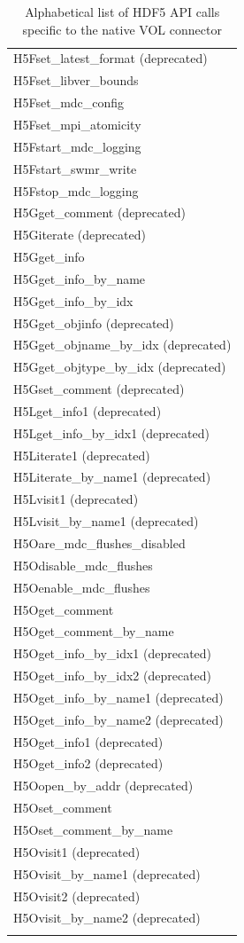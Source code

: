 \begin{longtable}{ |>{\raggedright\arraybackslash}p{\linewidth}| }
    H5Fset\_latest\_format (deprecated) \\
    H5Fset\_libver\_bounds \\
    H5Fset\_mdc\_config \\
    H5Fset\_mpi\_atomicity \\
    H5Fstart\_mdc\_logging \\
    H5Fstart\_swmr\_write \\
    H5Fstop\_mdc\_logging \\
    \hline
    H5Gget\_comment (deprecated) \\
    H5Giterate (deprecated) \\
    H5Gget\_info \\
    H5Gget\_info\_by\_name \\
    H5Gget\_info\_by\_idx \\
    H5Gget\_objinfo (deprecated) \\
    H5Gget\_objname\_by\_idx (deprecated) \\
    H5Gget\_objtype\_by\_idx (deprecated) \\
    H5Gset\_comment (deprecated) \\
    \hline
    H5Lget\_info1 (deprecated) \\
    H5Lget\_info\_by\_idx1 (deprecated) \\
    H5Literate1 (deprecated) \\
    H5Literate\_by\_name1 (deprecated) \\
    H5Lvisit1 (deprecated) \\
    H5Lvisit\_by\_name1 (deprecated) \\
    \hline
    H5Oare\_mdc\_flushes\_disabled \\
    H5Odisable\_mdc\_flushes \\
    H5Oenable\_mdc\_flushes \\
    H5Oget\_comment \\
    H5Oget\_comment\_by\_name \\
    H5Oget\_info\_by\_idx1 (deprecated) \\
    H5Oget\_info\_by\_idx2 (deprecated)\\
    H5Oget\_info\_by\_name1 (deprecated) \\
    H5Oget\_info\_by\_name2 (deprecated)\\
    H5Oget\_info1 (deprecated) \\
    H5Oget\_info2 (deprecated) \\
    H5Oopen\_by\_addr (deprecated) \\
    H5Oset\_comment \\
    H5Oset\_comment\_by\_name \\
    H5Ovisit1 (deprecated) \\
    H5Ovisit\_by\_name1 (deprecated) \\
    H5Ovisit2 (deprecated) \\
    H5Ovisit\_by\_name2 (deprecated) \\
    \hline
\caption{Alphabetical list of HDF5 API calls specific to the native VOL connector}
\end{longtable}

